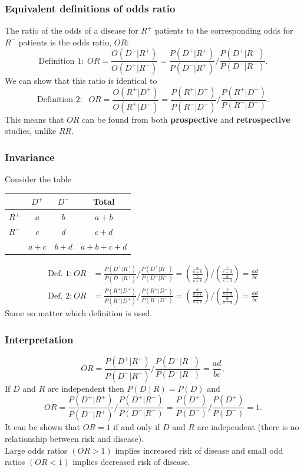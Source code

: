 \documentclass[a4paper]{article}
\begin{document}
\subsubsection{Equivalent definitions of odds ratio}
The ratio of the odds of a disease for \( R^+ \) patients to the corresponding odds for \( R^- \) patients is the odds ratio, \( OR \):
\[
	\text{Definition 1:}  \ \  OR = \frac{O(D^+|R^+)}{O(D^+|R^-)} =  \frac{P(D^+|R^+)}{P(D^-|R^+)} \Big/  \frac{P(D^+|R^-)}{P(D^-|R^-)}.
\]
We can show that this ratio is identical to
\[
	\text{Definition 2: }  \ \  OR = \frac{O(R^+|D^+)}{O(R^+|D^-)} = \frac{P(R^+|D^+)}{P(R^-|D^+)} \Big/ \frac{P(R^+|D^-)}{P(R^-|D^-)}.
\]
This means that \( OR \) can be found from both \textbf{prospective} and \textbf{retrospective} studies, unlike \( RR \).
\subsubsection{Invariance}
Consider the table
\begin{table}[H]
	\centering
	\begin{tabular}{@{}cccc@{}}
	\toprule
			  & \( D^+ \) & \( D^- \) & Total         \\ \midrule
	\( R^+ \) & \( a \)   & \( b \)   & \( a+b \)     \\
	\( R^- \) & \( c \)   & \( d \)   & \( c+d \)     \\ \midrule
			  & \( a+c \) & \( b+d \) & \( a+b+c+d \) \\ \bottomrule
	\end{tabular}
\end{table}
\begin{align*}
	\text{Def. 1:}  \  OR &= \frac{P(D^+|R^+)}{P(D^-|R^+)} \Big/  \frac{P(D^+|R^-)}{P(D^-|R^-)} = \left(\frac{\frac{a}{a+b}}{\frac{b}{a+b}}\right) \Big/ \left( \frac{\frac{c}{c+d}}{\frac{d}{c+d}} \right) = \frac{ad}{bc}\\
	\text{Def. 2:}  \  OR &= \frac{P(R^+|D^+)}{P(R^-|D^+)} \Big/ \frac{P(R^+|D^-)}{P(R^-|D^-)} = \left(\frac{\frac{a}{a+c}}{\frac{c}{a+c}}\right) \Big/ \left( \frac{\frac{b}{b+d}}{\frac{d}{b+d}} \right) = \frac{ad}{bc}
\end{align*}
Same no matter which definition is used.
\subsubsection{Interpretation}
\[
	OR = \frac{P(D^+|R^+)}{P(D^-|R^+)} \Big/  \frac{P(D^+|R^-)}{P(D^-|R^-)} = \frac{ad}{bc},
\]
If \( D \) and \( R \) are independent then \( P(D \mid R) = P(D) \) and
\[
	OR = \frac{P(D^+|R^+)}{P(D^-|R^+)} \Big/  \frac{P(D^+|R^-)}{P(D^-|R^-)} = \frac{P(D^+)}{P(D^-)} \Big/  \frac{P(D^+)}{P(D^-)} = 1.
\]
It can be shown that \( OR = 1 \) if and only if \( D \) and \( R \) are independent (there is no relationship between risk and disease).\\
Large odds ratios \( (OR>1) \) implies increased risk of disease and small odd ratios \( (OR < 1) \) implies decreased risk of disease.
\end{document}
